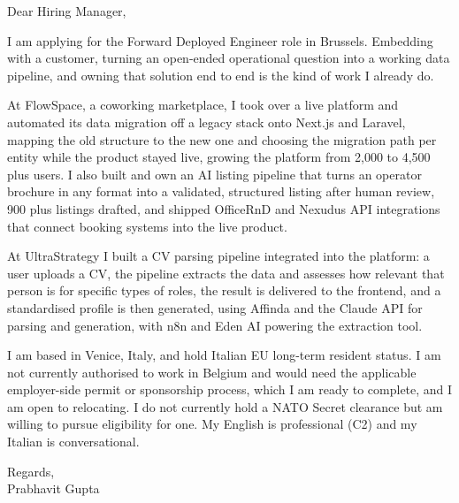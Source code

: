\documentclass[a4paper,11pt]{article}
\begin{document}
Dear Hiring Manager,

I am applying for the Forward Deployed Engineer role in Brussels. Embedding with a customer, turning an open-ended operational question into a working data pipeline, and owning that solution end to end is the kind of work I already do.

At FlowSpace, a coworking marketplace, I took over a live platform and automated its data migration off a legacy stack onto Next.js and Laravel, mapping the old structure to the new one and choosing the migration path per entity while the product stayed live, growing the platform from 2,000 to 4,500 plus users. I also built and own an AI listing pipeline that turns an operator brochure in any format into a validated, structured listing after human review, 900 plus listings drafted, and shipped OfficeRnD and Nexudus API integrations that connect booking systems into the live product.

At UltraStrategy I built a CV parsing pipeline integrated into the platform: a user uploads a CV, the pipeline extracts the data and assesses how relevant that person is for specific types of roles, the result is delivered to the frontend, and a standardised profile is then generated, using Affinda and the Claude API for parsing and generation, with n8n and Eden AI powering the extraction tool.

I am based in Venice, Italy, and hold Italian EU long-term resident status. I am not currently authorised to work in Belgium and would need the applicable employer-side permit or sponsorship process, which I am ready to complete, and I am open to relocating. I do not currently hold a NATO Secret clearance but am willing to pursue eligibility for one. My English is professional (C2) and my Italian is conversational.

Regards,\\
Prabhavit Gupta
\end{document}
